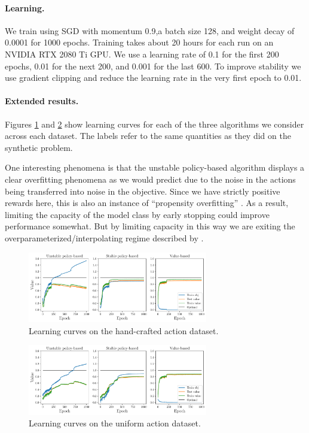 \begin{subappendices}
\paragraph{Learning.} We train using SGD with momentum 0.9,a batch size 128, and weight decay of 0.0001 for 1000 epochs. Training takes about 20 hours for each run on an NVIDIA RTX 2080 Ti GPU. We use a learning rate of 0.1 for the first 200 epochs, 0.01 for the next 200, and 0.001 for the last 600. To improve stability we use gradient clipping and reduce the learning rate in the very first epoch to 0.01.

\paragraph{Extended results.}
Figures \ref{fig:cifar_learning_blbf} and \ref{fig:cifar_learning_uniform} show learning curves for each of the three algorithms we consider across each dataset. The labels refer to the same quantities as they did on the synthetic problem.

One interesting phenomena is that the unstable policy-based algorithm displays a clear overfitting phenomena as we would predict due to the noise in the actions being transferred into noise in the objective. Since we have strictly positive rewards here, this is also an instance of ``propensity overfitting'' \cite{swaminathan2015self}. As a result, limiting the capacity of the model class by early stopping could improve performance somewhat. But by limiting capacity in this way we are exiting the overparameterized/interpolating regime described by \citet{zhang2016understanding}.

\begin{figure}[h]
    \centering
    \includegraphics[width=0.7\textwidth]{figures/offline-bandits/cifar_learning_blbf.pdf}
    \caption{Learning curves on the hand-crafted action dataset.}
    \label{fig:cifar_learning_blbf}
\end{figure}


\begin{figure}[h]
    \centering
    \includegraphics[width=0.7\textwidth]{figures/offline-bandits/cifar_learning_uniform_0.pdf}
    \caption{Learning curves on the uniform action dataset.}
    \label{fig:cifar_learning_uniform}
\end{figure}




\end{subappendices}
